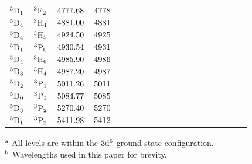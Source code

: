 \documentclass{emulateapj}
\begin{document}
\begin{table*}
\begin{tabular}{lccccccccccccccccc}
$\rm ^5D_1$		&$\rm ^3F_2$	&  $\rm 4777.68$   &  $\rm 4778$   			&\\                                         
	                                                                   
$\rm ^5D_4$		&$\rm ^3H_4$	&  $\rm 4881.00$   &  $\rm 4881$   			&\\ 
                                                                           
$\rm ^5D_4$		&$\rm ^3H_5$	&  $\rm 4924.50$   &  $\rm 4925$   			&\\  	
$\rm ^5D_1$		&$\rm ^3P_0$	&  $\rm 4930.54$   &  $\rm 4931$     		&\\                                                   
	                                                                   
$\rm ^5D_4$		&$\rm ^3H_6$	&  $\rm 4985.90$   &  $\rm 4986$   			&\\                                         
	                                                                   
$\rm ^5D_3$		&$\rm ^3H_4$	&  $\rm 4987.20$   &  $\rm 4987$   			&\\                                         
	                                                                   
$\rm ^5D_2$		&$\rm ^3P_1$	&  $\rm 5011.26$   &  $\rm 5011$   			&\\                                         
$\rm ^5D_0$		&$\rm ^3P_1$	&  $\rm 5084.77$   &  $\rm 5085$     		&\\                                         
$\rm ^5D_3$		&$\rm ^3P_2$	&  $\rm 5270.40$   &  $\rm 5270$     		&\\                                         
$\rm ^5D_1$		&$\rm ^3P_2$	&  $\rm 5411.98$   &  $\rm 5412$     		&\\                              	
                                        
\hline \hline
\end{tabular}
 
\begin{minipage}{6.5cm}%
{$\rm ^a$ All levels are within the $\rm 3d^6$ ground state configuration. } \\
{$\rm ^b$ Wavelengths used in this paper for brevity.}
\end{minipage}%




\end{table*}
\end{document}
